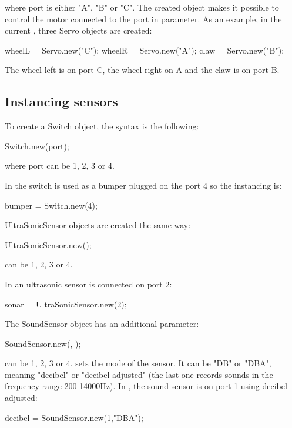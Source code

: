 where port is either "A", "B" or "C". The created object makes it possible
to control the motor connected to the port in parameter.  As an example, in
the current , three Servo objects are created:
\begin{urbiunchecked}
wheelL = Servo.new("C");
wheelR = Servo.new("A");
claw = Servo.new("B");
\end{urbiunchecked}

The wheel left is on port C, the wheel right on A and the claw is on port B.

\subsection{Instancing sensors}
To create a Switch object, the syntax is the following:
\begin{urbiunchecked}
Switch.new(port);
\end{urbiunchecked}

where port can be 1, 2, 3 or 4.

In  the switch is used as a bumper plugged on the port 4 so
the instancing is:
\begin{urbiunchecked}
bumper  = Switch.new(4);
\end{urbiunchecked}

UltraSonicSensor objects are created the same way:
\begin{urbiunchecked}
UltraSonicSensor.new();
\end{urbiunchecked}

 can be 1, 2, 3 or 4.

In  an ultrasonic sensor is connected on port 2:
\begin{urbiunchecked}
sonar = UltraSonicSensor.new(2);
\end{urbiunchecked}

The SoundSensor object has an additional parameter:
\begin{urbiunchecked}
SoundSensor.new(, );
\end{urbiunchecked}

 can be 1, 2, 3 or 4.   sets the mode of the sensor. It
can be "DB" or "DBA", meaning "decibel" or "decibel adjusted" (the last one
records sounds in the frequency range 200-14000Hz).  In , the
sound sensor is on port 1 using decibel adjusted:
\begin{urbiunchecked}
decibel = SoundSensor.new(1,"DBA");
\end{urbiunchecked}

